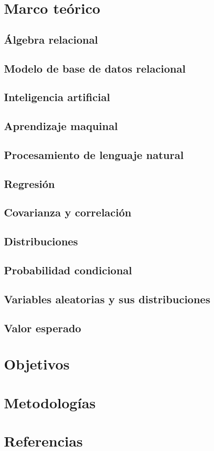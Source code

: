 \documentclass[12pt,letterpaper]{article}
\begin{document}
%
\tableofcontents
\pagebreak
\section {Marco teórico}\label{sec:marcot}
\subsection {Álgebra relacional}\label{subsec:algebra}
\subsection {Modelo de base de datos relacional}\label{subsch:rdb}
\subsection {Inteligencia artificial}\label{subsec:intela}
\subsection {Aprendizaje maquinal}\label{subsec:machinel}
\subsection {Procesamiento de lenguaje natural}\label{subsec:nlp}
\subsection {Regresión}\label{subsec:reg}%
\subsection {Covarianza y correlación}\label{subsec:reg1}
\subsection {Distribuciones}\label{subsec:dist}
\subsection {Probabilidad condicional}\label{subsec:pcond}
\subsection {Variables aleatorias y sus distribuciones}\label{subsec:vayd}
\subsection {Valor esperado}\label{subsec:valesp}
\section {Objetivos}\label{sec:objetivos}
\section {Metodologías}\label{sec:metod}
\section {Referencias}\label{sec:refs}
\printbibliography[heading=none]
\end{document}
